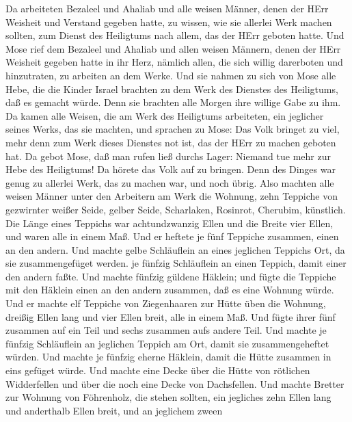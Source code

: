  Da arbeiteten Bezaleel und Ahaliab und alle weisen Männer,
denen der HErr Weisheit und Verstand gegeben hatte, zu wissen, wie sie
allerlei Werk machen sollten, zum Dienst des Heiligtums nach allem, das
der HErr geboten hatte.  Und Mose rief dem Bezaleel und
Ahaliab und allen weisen Männern, denen der HErr Weisheit gegeben hatte
in ihr Herz, nämlich allen, die sich willig darerboten und hinzutraten,
zu arbeiten an dem Werke.  Und sie nahmen zu sich von Mose
alle Hebe, die die Kinder Israel brachten zu dem Werk des Dienstes des
Heiligtums, daß es gemacht würde. Denn sie brachten alle Morgen ihre
willige Gabe zu ihm.  Da kamen alle Weisen, die am Werk des
Heiligtums arbeiteten, ein jeglicher seines Werks, das sie machten,
 und sprachen zu Mose: Das Volk bringet zu viel, mehr denn
zum Werk dieses Dienstes not ist, das der HErr zu machen geboten hat.
 Da gebot Mose, daß man rufen ließ durchs Lager: Niemand tue
mehr zur Hebe des Heiligtums! Da hörete das Volk auf zu bringen.
 Denn des Dinges war genug zu allerlei Werk, das zu machen
war, und noch übrig.  Also machten alle weisen Männer unter
den Arbeitern am Werk die Wohnung, zehn Teppiche von gezwirnter weißer
Seide, gelber Seide, Scharlaken, Rosinrot, Cherubim, künstlich.
 Die Länge eines Teppichs war achtundzwanzig Ellen und die
Breite vier Ellen, und waren alle in einem Maß.  Und er
heftete je fünf Teppiche zusammen, einen an den andern. 
Und machte gelbe Schläuflein an eines jeglichen Teppichs Ort, da sie
zusammengefüget werden.  je fünfzig Schläuflein an einen
Teppich, damit einer den andern faßte.  Und machte fünfzig
güldene Häklein; und fügte die Teppiche mit den Häklein einen an den
andern zusammen, daß es eine Wohnung würde.  Und er machte
elf Teppiche von Ziegenhaaren zur Hütte üben die Wohnung, 
dreißig Ellen lang und vier Ellen breit, alle in einem Maß.
 Und fügte ihrer fünf zusammen auf ein Teil und sechs
zusammen aufs andere Teil.  Und machte je fünfzig
Schläuflein an jeglichen Teppich am Ort, damit sie zusammengeheftet
würden.  Und machte je fünfzig eherne Häklein, damit die
Hütte zusammen in eins gefüget würde.  Und machte eine
Decke über die Hütte von rötlichen Widderfellen und über die noch eine
Decke von Dachsfellen.  Und machte Bretter zur Wohnung von
Föhrenholz, die stehen sollten,  ein jegliches zehn Ellen
lang und anderthalb Ellen breit,  und an jeglichem zween
